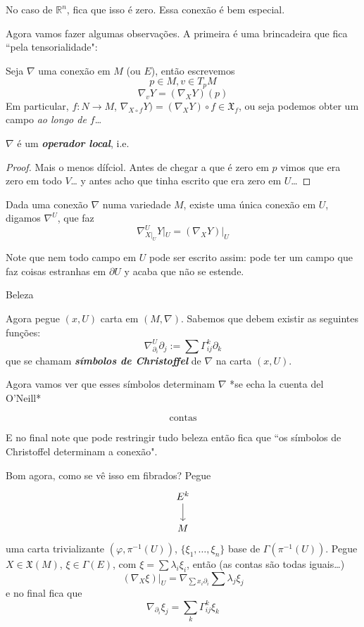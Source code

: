 No caso de \(\mathbb{R}^n\), fica que isso é zero. Essa conexão é bem especial.

Agora vamos fazer algumas observações. A primeira é uma brincadeira que fica ``pela tensorialidade":

Seja \(\nabla\) uma conexão em \(M\) (ou \(E\)), então escrevemos
\[p \in M, v \in T_pM\]
\[\nabla_v Y = (\nabla_X Y)(p)\]
Em particular, \(f :N \to M\), \(\nabla_{X \circ f}Y)=(\nabla_XY)\circ f\in \mathfrak{X}_f\), ou seja podemos obter um campo \textit{ao longo de \(f\)}…  
\begin{remark}\leavevmode
\(\nabla\) é um \textit{\textbf{operador local}}, i.e.
\end{remark}

\begin{proof}\leavevmode
Mais o menos dífciol. Antes de chegar a que é zero em \(p\) vimos que era zero em todo \(V\)… y antes acho que tinha escrito que era zero em \(U\)…
\end{proof}

\begin{coro}\leavevmode
Dada uma conexão \(\nabla\) numa variedade \(M\), existe uma única conexão em \(U\), digamos \(\nabla^U\), que faz
\[\nabla^U_{X|_{U}}Y|_{U}=(\nabla_XY)|_{U}\]
\end{coro}
\begin{remark}\leavevmode
Note que  nem todo campo em \(U\) pode ser escrito assim: pode ter um campo que faz coisas estranhas em \(\partial U\) y acaba que não se estende.
\end{remark}

Beleza

Agora pegue \((x,U)\) carta em  \((M,\nabla)\). Sabemos que debem existir as seguintes funções:
\[\nabla_{\partial_i}^U\partial_j:=\sum \Gamma_{ij}^k \partial_k\]
que se chamam \textit{\textbf{símbolos de Christoffel}} de \(\nabla\) na carta \((x,U)\).

Agora vamos ver que esses símbolos determinam \(\nabla\) *se echa la cuenta del O'Neill*

\[\text{contas} \]

E no final note que pode restringir tudo beleza então fica que ``os símbolos de Christoffel determinam a conexão".

Bom agora, como se vê isso em fibrados? Pegue
\[\begin{tikzcd}
E^k\arrow[d]\\
M
\end{tikzcd}\]
uma carta trivializante \((\varphi, \pi^{-1}(U))\), \(\{\xi_1,\ldots,\xi_n\}\) base de \(\Gamma(\pi^{-1}(U))\). Pegue \(X \in \mathfrak{X}(M)\), \(\xi \in \Gamma(E)\), com \(\xi=\sum \lambda_i\xi_i\), então (as contas são todas iguais…)
\[(\nabla_X \xi)|_{U}=\nabla_{\sum x_i \partial_i}\sum \lambda_j \xi_j\]
e no final fica que
\[\nabla_{\partial_i}\xi_j=\sum_k\Gamma_{ij}^k \xi_k\]

